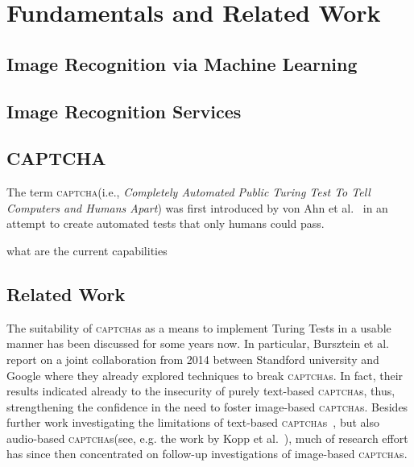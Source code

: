 \documentclass[sigconf,review,anonymous]{acmart}
\newcommand{\captcha}{\textsc{captcha}\xspace}
\newcommand{\captchas}{\textsc{captcha}s\xspace}
\begin{document}
\section{Fundamentals and Related Work}
\label{sec:RelWork}

\subsection{Image Recognition via Machine Learning}

\subsection{Image Recognition Services}



\subsection{CAPTCHA}


The term \captcha (i.e., \emph{Completely Automated Public Turing Test To Tell Computers and Humans Apart}) was first introduced by von Ahn et al.~\cite{von2003captcha} in an attempt to create automated tests that only humans could pass.

what are the current capabilities 

\subsection{Related Work} 

The suitability of \captchas as a means to implement Turing Tests in a usable manner has been discussed for some years now. In particular, Bursztein et al.~\cite{bursztein2014end} report on a joint collaboration from 2014 between Standford university and Google where they already explored techniques to break \captchas.  In fact, their results indicated already to the insecurity of purely text-based \captchas, thus, strengthening the confidence in the need to foster image-based \captchas. Besides further work investigating the limitations of text-based \captchas~\cite{starostenko_breaking_2015,baecher_breaking_2011,cruz-perez_breaking_2012}, but also audio-based \captchas (see, e.g. the work by Kopp et al.~\cite{kopp2016mimic}), much of research effort has since then concentrated on follow-up investigations of image-based \captchas.
\end{document}
